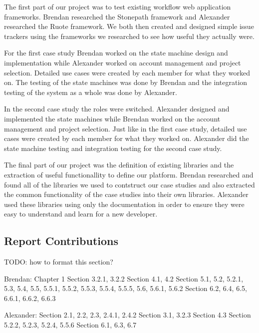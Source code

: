 \documentclass[document.tex]{subfiles}
\begin{document}
The first part of our project was to test existing workflow web application frameworks. Brendan researched the Stonepath framework and Alexander researched the Ruote framework. We both then created and designed simple issue trackers using the frameworks we researched to see how useful they actually were.

For the first case study Brendan worked on the state machine design and implementation while Alexander worked on account management and project selection. Detailed use cases were created by each member for what they worked on. The testing of the state machines was done by Brendan and the integration testing of the system as a whole was done by Alexander.

In the second case study the roles were switched. Alexander designed and implemented the state machines while Brendan worked on the account management and project selection. Just like in the first case study, detailed use cases were created by each member for what they worked on. Alexander did the state machine testing and integration testing for the second case study.

The final part of our project was the definition of existing libraries and the extraction of useful functionallity to define our platform. Brendan researched and found all of the libraries we used to contstruct our case studies and also extracted the common functionality of the case studies into their own libraries. Alexander used these libraries using only the documentation in order to ensure they were easy to understand and learn for a new developer.

\subsection{Report Contributions}

TODO: how to format this section?

Brendan:
Chapter 1
Section 3.2.1, 3.2.2
Section 4.1, 4.2
Section 5.1, 5.2, 5.2.1, 5.3, 5.4, 5.5, 5.5.1, 5.5.2, 5.5.3, 5.5.4, 5.5.5, 5.6, 5.6.1, 5.6.2
Section 6.2, 6.4, 6.5, 6.6.1, 6.6.2, 6.6.3

Alexander:
Section 2.1, 2.2, 2.3, 2.4.1, 2.4.2
Section 3.1, 3.2.3
Section 4.3
Section 5.2.2, 5.2.3, 5.2.4, 5.5.6
Section 6.1, 6.3, 6.7
\end{document}
